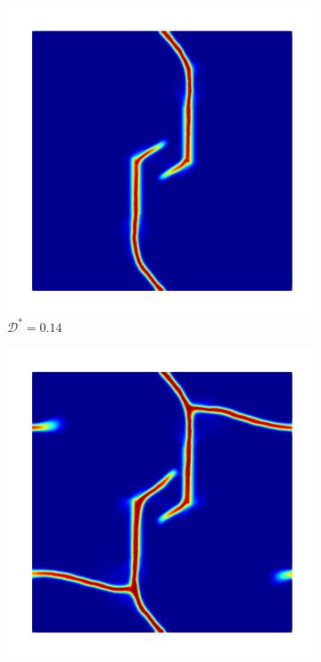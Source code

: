 \begin{figure}[htb!]
  \begin{subfigure}[b]{0.23\textwidth}
    \centering
    \includegraphics[width=\textwidth,scale=0.5]{Chapter4/figures/biaxial_spectral_1.png}
    \caption{$\mathcal{D}^* = 0.14$}
    \label{fig: Chapter4/biaxial_spectral_1}
  \end{subfigure}
  \hspace{0.03\textwidth}
  \begin{subfigure}[b]{0.23\textwidth}
    \centering
    \includegraphics[width=\textwidth,scale=0.5]{Chapter4/figures/biaxial_spectral_2.png}

\end{subfigure}
\end{figure}
